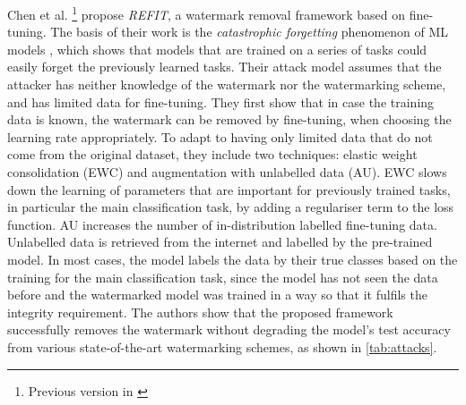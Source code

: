 
Chen et al. \cite{chen_refit_2020}\footnote{Previous version in \cite{chen_leveraging_2019}} propose \textit{REFIT}, a watermark removal framework based on fine-tuning. The basis of their work is the \textit{catastrophic forgetting} phenomenon of ML models \cite{goodfellow_empirical_2015}, which shows that models that are trained on a series of tasks could easily forget the previously learned tasks. Their attack model assumes that the attacker has neither knowledge of the watermark nor the watermarking scheme, and has limited data for fine-tuning.
They first show that in case the training data is known, the watermark can be removed by fine-tuning, when choosing the learning rate appropriately. To adapt to having only limited data that do not come from the original dataset, they include two techniques: elastic weight consolidation (EWC) and augmentation with unlabelled data (AU). EWC slows down the learning of parameters that are important for previously trained tasks, in particular the main classification task, by adding a regulariser term to the loss function. AU increases the number of in-distribution labelled fine-tuning data. Unlabelled data is retrieved from the internet and labelled by the pre-trained model. In most cases, the model labels the data by their true classes based on the training for the main classification task, since the model has not seen the data before and the watermarked model was trained in a way so that it fulfils the integrity requirement. The authors show that the proposed framework successfully removes the watermark without degrading the model's test accuracy from various state-of-the-art watermarking schemes, as shown in \cref{tab:attacks}.

